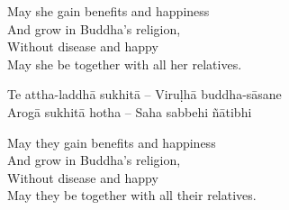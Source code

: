 \begin{english-verses}
  May she gain benefits and happiness\\
  And grow in Buddha's religion,\\
  Without disease and happy\\
  May she be together with all her relatives.
\end{english-verses}

\begin{twochants}
  Te attha-laddhā sukhitā – Viruḷhā buddha-sāsane\\
  Arogā sukhitā hotha – Saha sabbehi ñātibhi
\end{twochants}

\begin{english-verses}
  May they gain benefits and happiness\\
  And grow in Buddha's religion,\\
  Without disease and happy\\
  May they be together with all their relatives.
\end{english-verses}

\suttaRef{[AN 3.155]}

